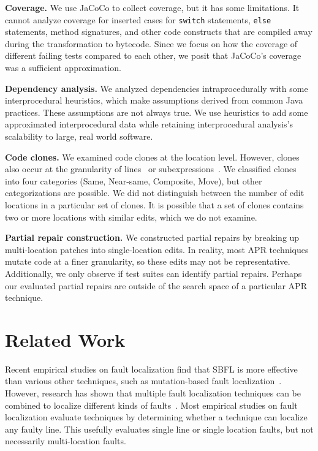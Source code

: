 \documentclass[10pt, conference]{IEEEtran}
\begin{document}
\vspace{1ex}
\noindent\textbf{Coverage.}
We use JaCoCo to collect coverage, but it has some
limitations. It cannot analyze coverage for inserted
cases for \texttt{switch} statements, \texttt{else} statements, method
signatures, and other code constructs that are compiled away during the
transformation to bytecode. Since we focus on how the coverage of different
failing tests compared to each other, we posit that JaCoCo's coverage was a
sufficient approximation.

\vspace{1ex}
\noindent\textbf{Dependency analysis.}
We analyzed dependencies intraprocedurally with some interprocedural 
heuristics, which make assumptions derived from common Java practices.
These assumptions are not always true. We use heuristics to add some
approximated interprocedural data while retaining interprocedural 
analysis's scalability to large, real world software.

\vspace{1ex}
\noindent\textbf{Code clones.}
We examined code clones at the location level.  However, clones also occur at the
granularity of lines~\cite{JiaClones} or
subexpressions~\cite{microclones}. We classified clones into four
categories (Same, Near-same, Composite, Move), but other categorizations 
are possible.
%
We did not distinguish between the number
of edit locations in a particular set of clones. It is possible that a set of
clones contains two or more locations with similar edits, which we do not examine. 

\vspace{1ex}
\noindent\textbf{Partial repair construction.}
We constructed partial repairs by breaking up multi-location patches
into single-location edits.
In reality, most APR techniques mutate code at a finer granularity, so
these edits may not be representative.  Additionally, we only observe if test suites
can identify partial repairs. Perhaps our evaluated partial repairs
are outside of the search space of a
particular APR technique.

\section{Related Work}
\label{sec:related}

Recent empirical studies on fault localization find that 
SBFL is more effective than various other techniques, such as 
mutation-based fault localization~\cite{pearson2017evaluating, mut-analysis}.
However, research has shown that multiple fault localization techniques can be
combined to localize different kinds of faults~\cite{zou2019empirical}. Most
empirical studies on fault localization evaluate techniques by determining
whether a technique can localize any faulty line. This usefully evaluates single
line or single location faults, but not necessarily multi-location faults.
\end{document}

